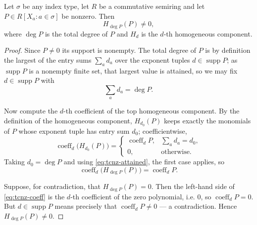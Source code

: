 \begin{lemma}
Let $\sigma$ be any index type, let $R$ be a commutative semiring and let
$P\in R[X_a:a\in\sigma]$ be nonzero. Then
\[
  H_{\deg P}(P)\ne0,
\]
where $\deg P$ is the total degree of $P$ and $H_d$ is the $d$-th homogeneous
component.
\end{lemma}
\begin{proof}
Since $P\ne0$ its support is nonempty. The total degree of $P$ is by definition
the largest of the entry sums $\sum_a d_a$ over the exponent tuples
$d\in\operatorname{supp}P$; as $\operatorname{supp}P$ is a nonempty finite set,
that largest value is attained, so we may fix $d\in\operatorname{supp}P$ with
\begin{equation}\label{eq:tcnz-attained}
  \sum_a d_a=\deg P .
\end{equation}

Now compute the $d$-th coefficient of the top homogeneous component. By the
definition of the homogeneous component, $H_{d_0}(P)$ keeps exactly the
monomials of $P$ whose exponent tuple has entry sum $d_0$; coefficientwise,
\[
  \operatorname{coeff}_d\bigl(H_{d_0}(P)\bigr)
  =\begin{cases}\operatorname{coeff}_dP,&\sum_a d_a=d_0,\\ 0,&\text{otherwise.}\end{cases}
\]
Taking $d_0=\deg P$ and using \eqref{eq:tcnz-attained}, the first case applies,
so
\begin{equation}\label{eq:tcnz-coeff}
  \operatorname{coeff}_d\bigl(H_{\deg P}(P)\bigr)=\operatorname{coeff}_dP .
\end{equation}

Suppose, for contradiction, that $H_{\deg P}(P)=0$. Then the left-hand side of
\eqref{eq:tcnz-coeff} is the $d$-th coefficient of the zero polynomial, i.e.
$0$, so $\operatorname{coeff}_dP=0$. But $d\in\operatorname{supp}P$ means
precisely that $\operatorname{coeff}_dP\ne0$ --- a contradiction. Hence
$H_{\deg P}(P)\ne0$.
\end{proof}
